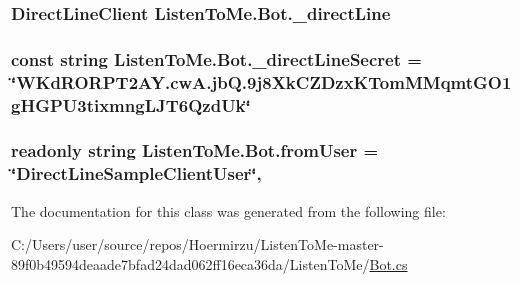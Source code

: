 \subsubsection[{\texorpdfstring{\+\_\+direct\+Line}{_directLine}}]{\setlength{\rightskip}{0pt plus 5cm}Direct\+Line\+Client Listen\+To\+Me.\+Bot.\+\_\+direct\+Line\hspace{0.3cm}{\ttfamily [private]}}\hypertarget{class_listen_to_me_1_1_bot_a964ea223816ac25f4ccf8357edb2f5ad}{}\label{class_listen_to_me_1_1_bot_a964ea223816ac25f4ccf8357edb2f5ad}
\subsubsection[{\texorpdfstring{\+\_\+direct\+Line\+Secret}{_directLineSecret}}]{\setlength{\rightskip}{0pt plus 5cm}const string Listen\+To\+Me.\+Bot.\+\_\+direct\+Line\+Secret = \char`\"{}W\+Kd\+R\+O\+R\+P\+T2\+A\+Y.\+cw\+A.\+jb\+Q.\+9j8\+Xk\+C\+Z\+Dzx\+K\+Tom\+M\+Mqmt\+G\+O1g\+H\+G\+P\+U3tixmng\+L\+J\+T6\+Qzd\+Uk\char`\"{}\hspace{0.3cm}{\ttfamily [private]}}\hypertarget{class_listen_to_me_1_1_bot_a3f7fa2c3cbea4ec11f5a75e2e8c9c72d}{}\label{class_listen_to_me_1_1_bot_a3f7fa2c3cbea4ec11f5a75e2e8c9c72d}
\subsubsection[{\texorpdfstring{from\+User}{fromUser}}]{\setlength{\rightskip}{0pt plus 5cm}readonly string Listen\+To\+Me.\+Bot.\+from\+User = \char`\"{}Direct\+Line\+Sample\+Client\+User\char`\"{}\hspace{0.3cm}{\ttfamily [static]}, {\ttfamily [private]}}\hypertarget{class_listen_to_me_1_1_bot_adeb0c25a77e095d890c32da6f06ed669}{}\label{class_listen_to_me_1_1_bot_adeb0c25a77e095d890c32da6f06ed669}


The documentation for this class was generated from the following file\+:\begin{DoxyCompactItemize}
\item 
C\+:/\+Users/user/source/repos/\+Hoermirzu/\+Listen\+To\+Me-\/master-\/89f0b49594deaade7bfad24dad062ff16eca36da/\+Listen\+To\+Me/\hyperlink{_bot_8cs}{Bot.\+cs}\end{DoxyCompactItemize}
